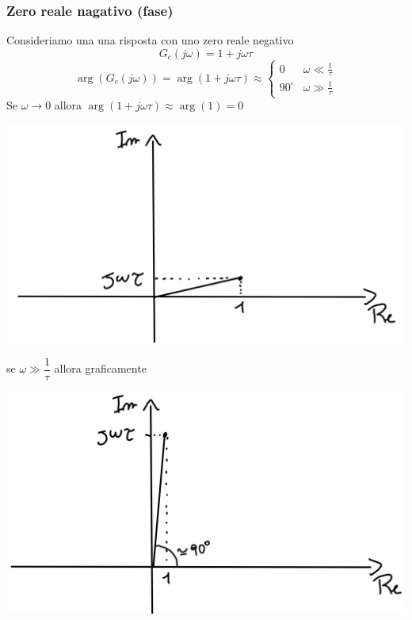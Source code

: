\documentclass{article}
\numberwithin{equation}{subsection}
\begin{document}
\subsubsection{Zero reale nagativo (fase)}
Consideriamo una una risposta con uno zero reale negativo
\[
    G_c(j\omega) = 1 + j \omega \tau  \tag*{$\tau > 0$}
\]
\[
    \arg(G_c(j\omega)) = \arg(1+j\omega \tau) \approx 
    \begin{cases}
        0 &\omega \ll \frac{1}{\tau}\\
        90^\circ & \omega \gg \frac{1}{\tau}
    \end{cases}    
\]
Se $\omega \rightarrow 0$ allora $\arg(1+j\omega\tau) \approx \arg(1)=0$
\begin{center}
    \includegraphics[scale=0.15]{Images/Diagramma_zero_reale_negativo_1.png}
\end{center}
se $\omega \gg \dfrac{1}{\tau}$ allora graficamente
\begin{center}
    \includegraphics[scale=0.15]{Images/Diagramma_zero_reale_negativo_2.png}
\end{center}
\end{document}
